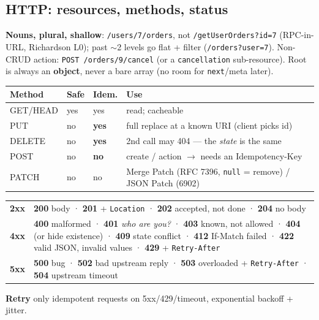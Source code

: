 \documentclass[8pt]{extarticle}
\begin{document}
\begin{multicols}{2}
\raggedright

\section{HTTP: resources, methods, status}
\textbf{Nouns, plural, shallow}: \texttt{/users/7/orders}, not \texttt{/getUserOrders?id=7}
(RPC-in-URL, Richardson L0); past $\sim$2 levels go flat + filter (\texttt{/orders?user=7}).
Non-CRUD action: \texttt{POST /orders/9/cancel} (or a \texttt{cancellation} sub-resource).
Root is always an \textbf{object}, never a bare array (no room for \texttt{next}/meta later).

{\footnotesize\setlength\tabcolsep{3pt}
\begin{tabular}{@{}L{11mm}L{6mm}L{7mm}L{51mm}@{}}
\toprule
\textbf{Method} & \textbf{Safe} & \textbf{Idem.} & \textbf{Use} \\
\midrule
GET/HEAD & yes & yes & read; cacheable \\
PUT & no & \textbf{yes} & full replace at a known URI (client picks id) \\
DELETE & no & \textbf{yes} & 2nd call may 404 — the \emph{state} is the same \\
POST & no & \textbf{no} & create / action $\to$ needs an Idempotency-Key \\
PATCH & no & no & Merge Patch (RFC 7396, \texttt{null} = remove) / JSON Patch (6902) \\
\bottomrule
\end{tabular}}

{\footnotesize\setlength\tabcolsep{3pt}
\begin{tabular}{@{}L{6mm}L{72mm}@{}}
\textbf{2xx} & \textbf{200} body · \textbf{201} + \texttt{Location} · \textbf{202} accepted, not done · \textbf{204} no body \\
\textbf{4xx} & \textbf{400} malformed · \textbf{401} \emph{who are you?} · \textbf{403} known, not allowed · \textbf{404} (or hide existence) · \textbf{409} state conflict · \textbf{412} If-Match failed · \textbf{422} valid JSON, invalid values · \textbf{429} + \texttt{Retry-After} \\
\textbf{5xx} & \textbf{500} bug · \textbf{502} bad upstream reply · \textbf{503} overloaded + \texttt{Retry-After} · \textbf{504} upstream timeout \\
\end{tabular}}
\textbf{Retry} only idempotent requests on 5xx/429/timeout, exponential backoff + jitter.


\end{multicols}
\end{document}
